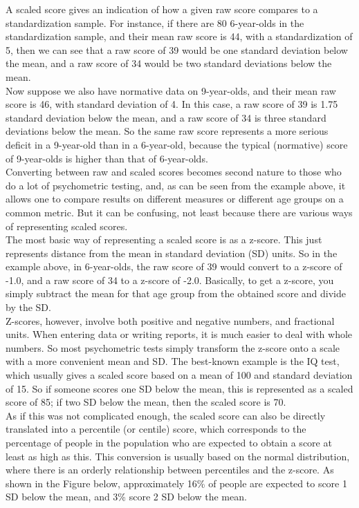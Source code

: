 \documentclass{krantz}
\begin{document}
\begin{tcolorbox}[enhanced, breakable,colback=Black!5!lightgray,colframe=black!75!black,coltitle=white,title=How scaled scores are derived]
A scaled score gives an indication of how a given raw score compares to a standardization sample. For instance, if there are 80 6-year-olds in the standardization sample, and their mean raw score is 44, with a standardization of 5, then we can see that a raw score of 39 would be one standard deviation below the mean, and a raw score of 34 would be two standard deviations below the mean.\\
Now suppose we also have normative data on 9-year-olds, and their mean raw score is 46, with standard deviation of 4. In this case, a raw score of 39 is 1.75 standard deviation below the mean, and a raw score of 34 is three standard deviations below the mean. So the same raw score represents a more serious deficit in a 9-year-old than in a 6-year-old, because the typical (normative) score of 9-year-olds is higher than that of 6-year-olds.\\
Converting between raw and scaled scores becomes second nature to those who do a lot of psychometric testing, and, as can be seen from the example above, it allows one to compare results on different measures or different age groups on a common metric. But it can be confusing, not least because there are various ways of representing scaled scores.\\
The most basic way of representing a scaled score is as a z-score. This just represents distance from the mean in standard deviation (SD) units. So in the example above, in 6-year-olds, the raw score of 39 would convert to a z-score of -1.0, and a raw score of 34 to a z-score of -2.0. Basically, to get a z-score, you simply subtract the mean for that age group from the obtained score and divide by the SD.\\
Z-scores, however, involve both positive and negative numbers, and fractional units. When entering data or writing reports, it is much easier to deal with whole numbers. So most psychometric tests simply transform the z-score onto a scale with a more convenient mean and SD. The best-known example is the IQ test, which usually gives a scaled score based on a mean of 100 and standard deviation of 15. So if someone scores one SD below the mean, this is represented as a scaled score of 85; if two SD below the mean, then the scaled score is 70.\\
As if this was not complicated enough, the scaled score can also be directly translated into a percentile (or centile) score, which corresponds to the percentage of people in the population who are expected to obtain a score at least as high as this. This conversion is usually based on the normal distribution, where there is an orderly relationship between percentiles and the z-score. As shown in the Figure below, approximately 16\% of people are expected to score 1 SD below the mean, and 3\% score 2 SD below the mean.



\end{tcolorbox}
\end{document}
